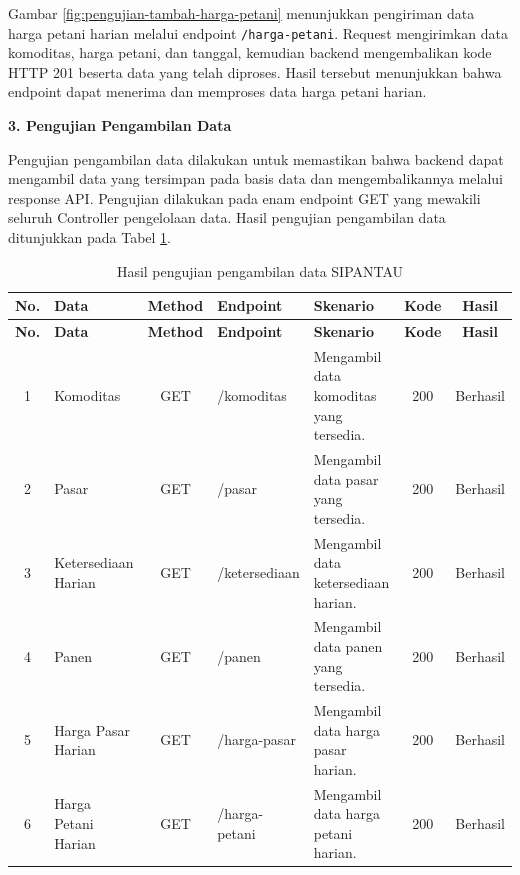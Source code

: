 Gambar \ref{fig:pengujian-tambah-harga-petani} menunjukkan pengiriman data harga petani harian melalui endpoint \texttt{/harga-petani}. Request mengirimkan data komoditas, harga petani, dan tanggal, kemudian backend mengembalikan kode HTTP 201 beserta data yang telah diproses. Hasil tersebut menunjukkan bahwa endpoint dapat menerima dan memproses data harga petani harian.

\vspace{0.5em}
\noindent\textbf{3. Pengujian Pengambilan Data}
\vspace{0.5em}

Pengujian pengambilan data dilakukan untuk memastikan bahwa backend dapat mengambil data yang tersimpan pada basis data dan mengembalikannya melalui response API. Pengujian dilakukan pada enam endpoint GET yang mewakili seluruh Controller pengelolaan data. Hasil pengujian pengambilan data ditunjukkan pada Tabel \ref{tab:pengujian-pengambilan-data}.

\begin{longtable}{|c|p{2cm}|c|p{2.3cm}|p{2.7cm}|c|c|}
\caption{Hasil pengujian pengambilan data SIPANTAU}
\label{tab:pengujian-pengambilan-data} \\

\hline
\textbf{No.} &
\textbf{Data} &
\textbf{Method} &
\textbf{Endpoint} &
\textbf{Skenario} &
\textbf{Kode} &
\textbf{Hasil} \\

\hline
\endfirsthead

\hline
\textbf{No.} &
\textbf{Data} &
\textbf{Method} &
\textbf{Endpoint} &
\textbf{Skenario} &
\textbf{Kode} &
\textbf{Hasil} \\

\hline
\endhead

1 &
Komoditas &
GET &
/komoditas &
Mengambil data komoditas yang tersedia. &
200 &
Berhasil \\ \hline

2 &
Pasar &
GET &
/pasar &
Mengambil data pasar yang tersedia. &
200 &
Berhasil \\ \hline

3 &
Ketersediaan Harian &
GET &
/ketersediaan &
Mengambil data ketersediaan harian. &
200 &
Berhasil \\ \hline

4 &
Panen &
GET &
/panen &
Mengambil data panen yang tersedia. &
200 &
Berhasil \\ \hline

5 &
Harga Pasar Harian &
GET &
/harga-pasar &
Mengambil data harga pasar harian. &
200 &
Berhasil \\ \hline

6 &
Harga Petani Harian &
GET &
/harga-petani &
Mengambil data harga petani harian. &
200 &
Berhasil \\ \hline

\end{longtable}

